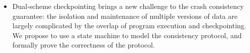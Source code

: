 \begin{eabstract}
\begin{itemize}
\item Dual-scheme checkpointing brings a new challenge to the crash consistency guarantee: the isolation and maintenance of multiple versions of data are largely complicated by the overlap of program execution and checkpointing. We propose to use a state machine to model the consistency protocol, and formally prove the correctness of the protocol.

\end{itemize}

\end{eabstract}



